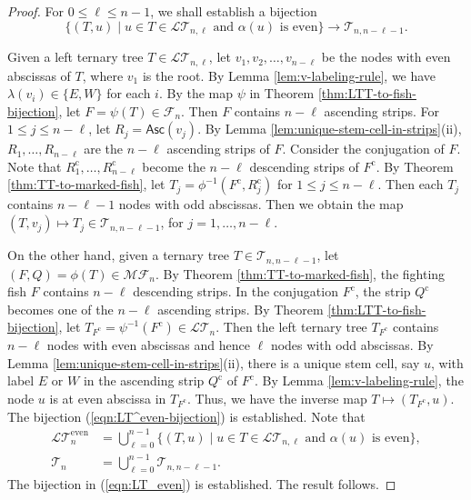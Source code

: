 \documentclass[a4paper,11pt,reqno]{amsart}
\theoremstyle{definition}
\numberwithin{equation}{section}
\newcommand{\Asc}{{\textsf{Asc}}}
\newcommand{\cc}{{\mathrm{c}}}
\newcommand{\MF}{{\mathcal{MF}}}
\newcommand{\LT}{{\mathcal{LT}}}
\newcommand{\F}{{\mathcal{F}}}
\newcommand{\T}{{\mathcal{T}}}
\newcommand{\even}{{\textrm{even}}}
\begin{document}
\begin{proof}
For $0\le \ell\le n-1$, we shall establish a bijection
\begin{equation} \label{eqn:LT^even-bijection}
\{(T,u)\mid u\in T\in\LT_{n,\ell}\mbox{ and $\alpha(u)$ is even}\}\rightarrow\T_{n,n-\ell-1}.
\end{equation}

Given a left ternary tree $T\in\LT_{n,\ell}$, let $v_1,v_2,\dots,v_{n-\ell}$ be the nodes with even abscissas of $T$, where $v_1$ is the root. By Lemma \ref{lem:v-labeling-rule}, we have $\lambda(v_i)\in\{E,W\}$ for each $i$. By the map $\psi$ in Theorem \ref{thm:LTT-to-fish-bijection}, let $F=\psi(T)\in\F_n$. Then $F$ contains $n-\ell$ ascending strips.
For $1\le j\le n-\ell$, let $R_j=\Asc(v_j)$.
By Lemma \ref{lem:unique-stem-cell-in-strips}(ii), $R_1,\dots,R_{n-\ell}$ are the $n-\ell$ ascending strips of $F$. Consider the conjugation of $F$. Note that $R^{\cc}_1,\dots,R^{\cc}_{n-\ell}$ become the $n-\ell$ descending strips of $F^{\cc}$.  By Theorem \ref{thm:TT-to-marked-fish}, let $T_j=\phi^{-1}(F^{\cc},R^{\cc}_j)$ for $1\le j\le n-\ell$. Then each $T_j$ contains $n-\ell-1$ nodes with odd abscissas. Then we obtain the map $(T,v_j)\mapsto T_j\in\T_{n,n-\ell-1}$, for $j=1,\dots, n-\ell$.

On the other hand, given a ternary tree $T\in\T_{n,n-\ell-1}$, let $(F,Q)=\phi(T)\in\MF_n$. By Theorem \ref{thm:TT-to-marked-fish}, the fighting fish $F$ contains $n-\ell$ descending strips. In the conjugation  $F^{\cc}$, the strip $Q^{\cc}$ becomes one of the $n-\ell$ ascending strips.  By Theorem \ref{thm:LTT-to-fish-bijection}, let $T_{F^{\cc}}=\psi^{-1}(F^{\cc})\in\LT_n$. Then the left ternary tree $T_{F^{\cc}}$ contains $n-\ell$ nodes with even abscissas and hence $\ell$ nodes with odd abscissas. By Lemma \ref{lem:unique-stem-cell-in-strips}(ii), there is a unique stem cell, say $u$, with label $E$ or $W$ in the ascending strip $Q^{\cc}$ of $F^{\cc}$. By Lemma \ref{lem:v-labeling-rule}, the node $u$ is at even abscissa in $T_{F^{\cc}}$. Thus, we have the inverse map $T\mapsto (T_{F^{\cc}},u)$. The bijection (\ref{eqn:LT^even-bijection}) is established. Note that
\begin{align*}
\LT_n^{\even} &= \bigcup_{\ell=0}^{n-1} 
\{(T,u)\mid u\in T\in\LT_{n,\ell}\mbox{ and $\alpha(u)$ is even}\}, \\
\T_n &= \bigcup_{\ell=0}^{n-1} \T_{n,n-\ell-1}.
\end{align*}
The bijection in (\ref{eqn:LT_even}) is established. The result follows.
\end{proof}
\end{document}
